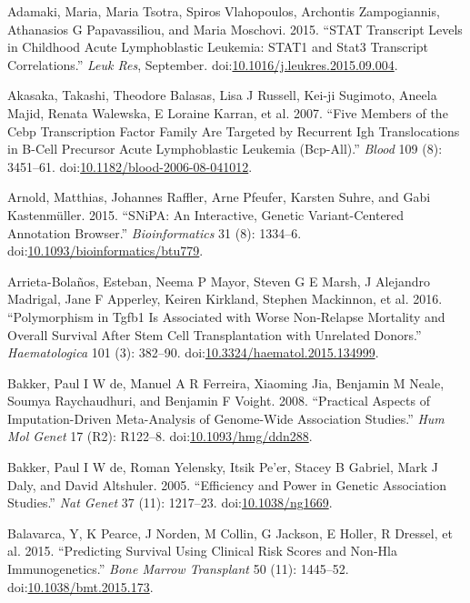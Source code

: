 \documentclass[]{DissertateOSU}
\begin{document}
\hypertarget{ref-Adamaki_2015}{}
Adamaki, Maria, Maria Tsotra, Spiros Vlahopoulos, Archontis
Zampogiannis, Athanasios G Papavassiliou, and Maria Moschovi. 2015.
``STAT Transcript Levels in Childhood Acute Lymphoblastic Leukemia:
STAT1 and Stat3 Transcript Correlations.'' \emph{Leuk Res}, September.
doi:\href{https://doi.org/10.1016/j.leukres.2015.09.004}{10.1016/j.leukres.2015.09.004}.

\hypertarget{ref-Akasaka_2007}{}
Akasaka, Takashi, Theodore Balasas, Lisa J Russell, Kei-ji Sugimoto,
Aneela Majid, Renata Walewska, E Loraine Karran, et al. 2007. ``Five
Members of the Cebp Transcription Factor Family Are Targeted by
Recurrent Igh Translocations in B-Cell Precursor Acute Lymphoblastic
Leukemia (Bcp-All).'' \emph{Blood} 109 (8): 3451--61.
doi:\href{https://doi.org/10.1182/blood-2006-08-041012}{10.1182/blood-2006-08-041012}.

\hypertarget{ref-snipa}{}
Arnold, Matthias, Johannes Raffler, Arne Pfeufer, Karsten Suhre, and
Gabi Kastenmüller. 2015. ``SNiPA: An Interactive, Genetic
Variant-Centered Annotation Browser.'' \emph{Bioinformatics} 31 (8):
1334--6.
doi:\href{https://doi.org/10.1093/bioinformatics/btu779}{10.1093/bioinformatics/btu779}.

\hypertarget{ref-bolanos_2016}{}
Arrieta-Bolaños, Esteban, Neema P Mayor, Steven G E Marsh, J Alejandro
Madrigal, Jane F Apperley, Keiren Kirkland, Stephen Mackinnon, et al.
2016. ``Polymorphism in Tgfb1 Is Associated with Worse Non-Relapse
Mortality and Overall Survival After Stem Cell Transplantation with
Unrelated Donors.'' \emph{Haematologica} 101 (3): 382--90.
doi:\href{https://doi.org/10.3324/haematol.2015.134999}{10.3324/haematol.2015.134999}.

\hypertarget{ref-bakker_2008}{}
Bakker, Paul I W de, Manuel A R Ferreira, Xiaoming Jia, Benjamin M
Neale, Soumya Raychaudhuri, and Benjamin F Voight. 2008. ``Practical
Aspects of Imputation-Driven Meta-Analysis of Genome-Wide Association
Studies.'' \emph{Hum Mol Genet} 17 (R2): R122--8.
doi:\href{https://doi.org/10.1093/hmg/ddn288}{10.1093/hmg/ddn288}.

\hypertarget{ref-bakker_2005}{}
Bakker, Paul I W de, Roman Yelensky, Itsik Pe'er, Stacey B Gabriel, Mark
J Daly, and David Altshuler. 2005. ``Efficiency and Power in Genetic
Association Studies.'' \emph{Nat Genet} 37 (11): 1217--23.
doi:\href{https://doi.org/10.1038/ng1669}{10.1038/ng1669}.

\hypertarget{ref-balavarca_2015}{}
Balavarca, Y, K Pearce, J Norden, M Collin, G Jackson, E Holler, R
Dressel, et al. 2015. ``Predicting Survival Using Clinical Risk Scores
and Non-Hla Immunogenetics.'' \emph{Bone Marrow Transplant} 50 (11):
1445--52.
doi:\href{https://doi.org/10.1038/bmt.2015.173}{10.1038/bmt.2015.173}.
\end{document}
